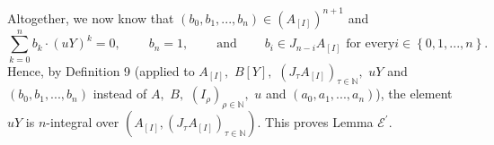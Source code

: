 \documentclass[12pt,final,notitlepage,onecolumn]{article}%
\begin{document}
Altogether, we now know that $\left(  b_{0},b_{1},...,b_{n}\right)  \in\left(
A_{\left[  I\right]  }\right)  ^{n+1}$ and%
\[
\sum\limits_{k=0}^{n}b_{k}\cdot\left(  uY\right)  ^{k}%
=0,\ \ \ \ \ \ \ \ \ \ b_{n}=1,\ \ \ \ \ \ \ \ \ \ \text{and}%
\ \ \ \ \ \ \ \ \ \ b_{i}\in J_{n-i}A_{\left[  I\right]  }\text{ for every
}i\in\left\{  0,1,...,n\right\}  .
\]
Hence, by Definition 9 (applied to $A_{\left[  I\right]  },$ $B\left[
Y\right]  ,$ $\left(  J_{\tau}A_{\left[  I\right]  }\right)  _{\tau
\in\mathbb{N}},$ $uY$ and $\left(  b_{0},b_{1},...,b_{n}\right)  $ instead of
$A,$ $B,$ $\left(  I_{\rho}\right)  _{\rho\in\mathbb{N}},$ $u$ and $\left(
a_{0},a_{1},...,a_{n}\right)  $), the element $uY$ is $n$-integral over
$\left(  A_{\left[  I\right]  },\left(  J_{\tau}A_{\left[  I\right]  }\right)
_{\tau\in\mathbb{N}}\right)  $. This proves Lemma $\mathcal{E}^{\prime}$.
\end{document}
